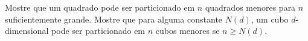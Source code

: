 Mostre que um quadrado pode ser particionado em \(n\) quadrados menores para \(n\) suficientemente grande. Mostre que para alguma constante \(N(d)\), um cubo \(d\)-dimensional pode ser particionado em \(n\) cubos menores se \(n \geq N(d)\).
